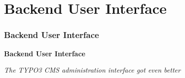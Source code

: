 %

\section{Backend User Interface}
\begin{frame}[fragile]
	\frametitle{Backend User Interface}

	\begin{center}\huge{\color{typo3darkgrey}\textbf{Backend User Interface}}\end{center}
	\begin{center}\large{\textit{The TYPO3 CMS administration interface got even better}}\end{center}

\end{frame}

